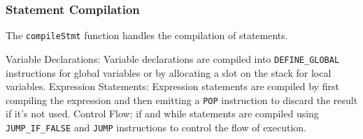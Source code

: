 \subsubsection{Statement Compilation}

The \texttt{compileStmt} function handles the compilation of statements.

    Variable Declarations: Variable declarations are compiled into \texttt{DEFINE_GLOBAL} instructions for global variables or by allocating a slot on the stack for local variables.
    Expression Statements: Expression statements are compiled by first compiling the expression and then emitting a \texttt{POP} instruction to discard the result if it's not used.
    Control Flow: if and while statements are compiled using \texttt{JUMP_IF_FALSE} and \texttt{JUMP} instructions to control the flow of execution.

